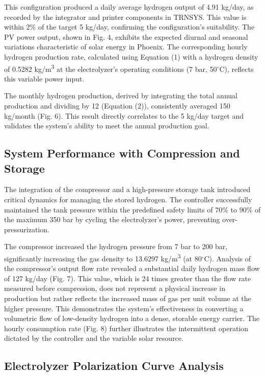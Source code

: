 \documentclass[11pt,a4paper]{article}
\begin{document}
This configuration produced a daily average hydrogen output of 4.91 kg/day, as recorded by the integrator and printer components in TRNSYS. This value is within 2\% of the target 5 kg/day, confirming the configuration's suitability. The PV power output, shown in Fig. 4, exhibits the expected diurnal and seasonal variations characteristic of solar energy in Phoenix. The corresponding hourly hydrogen production rate, calculated using Equation (1) with a hydrogen density of 0.5282 kg/m\textsuperscript{3} at the electrolyzer's operating conditions (7 bar, 50$^\circ$C), reflects this variable power input.

The monthly hydrogen production, derived by integrating the total annual production and dividing by 12 (Equation (2)), consistently averaged 150 kg/month (Fig. 6). This result directly correlates to the 5 kg/day target and validates the system's ability to meet the annual production goal.

\subsection{System Performance with Compression and Storage}

The integration of the compressor and a high-pressure storage tank introduced critical dynamics for managing the stored hydrogen. The controller successfully maintained the tank pressure within the predefined safety limits of 70\% to 90\% of the maximum 350 bar by cycling the electrolyzer's power, preventing over-pressurization.

The compressor increased the hydrogen pressure from 7 bar to 200 bar, significantly increasing the gas density to 13.6297 kg/m\textsuperscript{3} (at 80$^\circ$C). Analysis of the compressor's output flow rate revealed a substantial daily hydrogen mass flow of 127 kg/day (Fig. 7). This value, which is 24 times greater than the flow rate measured before compression, does not represent a physical increase in production but rather reflects the increased mass of gas per unit volume at the higher pressure. This demonstrates the system's effectiveness in converting a volumetric flow of low-density hydrogen into a dense, storable energy carrier. The hourly consumption rate (Fig. 8) further illustrates the intermittent operation dictated by the controller and the variable solar resource.

\subsection{Electrolyzer Polarization Curve Analysis}
\end{document}
